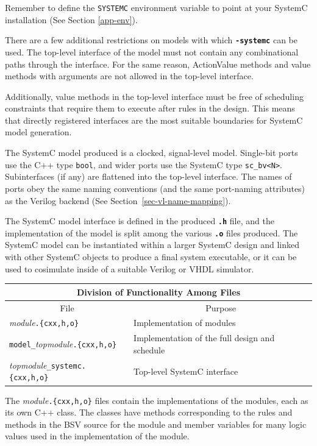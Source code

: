 \documentclass{article}
\newcommand{\te}[1]{\texttt{#1}}
\begin{document}
Remember to define the \te{SYSTEMC} environment variable to point at
your SystemC installation (See Section \ref{app-env}).

There are a few additional restrictions on models with which
{\bf\tt -systemc} can be used.  The top-level interface of the model
must not contain any combinational paths through the interface.  For
the same reason, ActionValue methods and value methods with arguments
are not allowed in the top-level interface.

Additionally, value methods in the top-level interface must be free
of scheduling constraints that require them to execute after rules
in the design.  This means that directly registered interfaces are the
most suitable boundaries for SystemC model generation.

The SystemC model produced is a clocked, signal-level model.
Single-bit ports use the C++ type {\tt bool}, and wider ports use the
SystemC type {\tt sc\_bv<N>}.  Subinterfaces (if any) are flattened
into the top-level interface.  The names of ports obey the same naming
conventions (and the same port-naming attributes) as the Verilog backend
(See Section~\ref{sec-vl-name-mapping}).

The SystemC model interface is defined in the produced {\bf\tt .h}
file, and the implementation of the model is split among the various
{\bf\tt .o} files produced.  The SystemC model can be instantiated
within a larger SystemC design and linked with other SystemC objects
to produce a final system executable, or it can be used to cosimulate
inside of a suitable Verilog or VHDL simulator.

\begin{center}
\begin{tabular}{|l|l|}
\hline
\multicolumn{2}{|c|}{Division of Functionality Among Files} \\
\hline
\multicolumn{1}{|c|}{File} & \multicolumn{1}{|c|}{Purpose} \\
\hline
{\em module}\te{.\{cxx,h,o\}} & Implementation of modules \\
\te{model\_}{\em topmodule}\te{.\{cxx,h,o\}} & Implementation of the full design and schedule \\
{\em topmodule}\te{\_systemc.\{cxx,h,o\}} & Top-level SystemC interface \\
\hline
\end{tabular}
\end{center}

The {\em module}\te{.\{cxx,h,o\}} files contain the implementations of the modules,
each as its own C++ class.  The classes have methods corresponding to
the rules and methods in the BSV source for the module and member
variables for many logic values used in the implementation of the
module.
\end{document}
